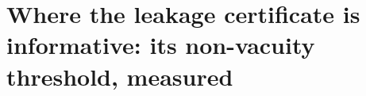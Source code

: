 

\section{Where the leakage certificate is informative: its non-vacuity threshold, measured}
\label{sec:frontier}

